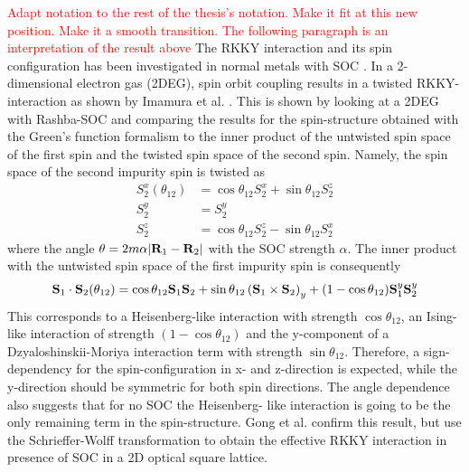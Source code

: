 \textcolor{red}{Adapt notation to the rest of the thesis's notation. Make it fit at this new position. Make it a smooth transition. The following paragraph is an interpretation of the result above}\newline
The RKKY interaction and its spin configuration has been investigated in normal metals with SOC \cite{gong2015dzyaloshinskii, imamura2004twisted, valizadeh_mohammad_m_magnetic_2017}.
In a 2-dimensional electron gas (2DEG), spin orbit coupling results in a twisted RKKY-interaction as shown by Imamura et al. \cite{imamura2004twisted}. 
This is shown by looking at a 2DEG with Rashba-SOC and comparing the results for the spin-structure obtained with the Green's function formalism to the inner product of the untwisted spin space of the first spin and the twisted spin space of the second spin.
Namely, the spin space of the second impurity spin is twisted as
\begin{align} \nonumber
    S_2^x(\theta_{12}) &= \cos{\theta_{12}}S_2^x + \sin{\theta_{12}} S_2^z \\ \nonumber
    S_2^y &= S_2^y \\ \nonumber
    S_2^z &= \cos{\theta_{12}}S_2^z - \sin{\theta_{12}} S_2^x
\end{align}
where the angle $\theta = 2 m\alpha |\vb{R}_1 - \vb{R}_2|$ with the SOC strength $\alpha$. \newline
The inner product with the untwisted spin space of the first impurity spin is consequently
\begin{align}
    \vb{S}_1 \cdot \vb{S}_2(\theta_{12}) = \cos{\theta_{12}} \vb{S}_1 \vb{S}_2 + \sin{\theta_{12}} \left( \vb{S}_1 \times \vb{S}_2 \right)_y + (1- \cos{\theta_{12}}) \vb{S}^y_1 \vb{S}^y_2
 \end{align}
 This corresponds to a Heisenberg-like interaction with strength $\cos{\theta_{12}}$, an Ising-like interaction of strength $(1- \cos{\theta_{12}})$ and the y-component of a Dzyaloshinskii-Moriya interaction term with strength $\sin{\theta_{12}}$. \newline
Therefore, a sign- dependency for the spin-configuration in x- and z-direction is expected, while the y-direction should be symmetric for both spin directions.
The angle dependence also suggests that for no SOC the Heisenberg- like interaction is going to be the only remaining term in the spin-structure. \newline
Gong et al. \cite{gong2015dzyaloshinskii} confirm this result, but use the Schrieffer-Wolff transformation to obtain the effective RKKY interaction in presence of SOC in a 2D optical square lattice. 
